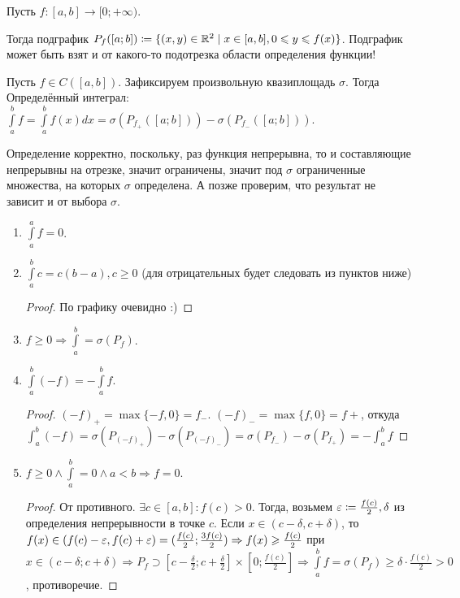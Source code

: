 \begin{definition}
	Пусть $f\!: [a, b] \to [0; +\infty)$.

    Тогда подграфик $P_f([a; b]) \coloneqq \{(x, y) \in \mathbb{R}^2 \mid x \in [a, b], 0 \leqslant y \leqslant f(x)\}$.
    Подграфик может быть взят и от какого-то подотрезка области определения функции!
\end{definition}
\begin{definition}
    Пусть $f \in C([a, b])$. Зафиксируем произвольную квазиплощадь $\sigma$. Тогда
    Определённый интеграл: $\int\limits_a^b f = \int\limits_a^b f(x) dx = \sigma(P_{f_+}([a; b])) - \sigma(P_{f_-}([a; b]))$.

    Определение корректно, поскольку, раз функция непрерывна, то и составляющие непрерывны на отрезке, значит ограничены, значит под $\sigma$ ограниченные множества, на которых $\sigma$ определена. А позже проверим, что результат не зависит и от выбора $\sigma$.
\end{definition}
\begin{properties}
    \begin{enumerate}
        \item $\int\limits_a^a f = 0$.
	\item $\int\limits_a^b c = c(b-a), c \ge 0$ (для отрицательных будет следовать из пунктов ниже)
            \begin{proof}
                По графику очевидно :)
            \end{proof}
        \item $f \ge 0 \Rightarrow \int\limits_a^b = \sigma(P_f)$.
        \item $\int\limits_a^b (-f) = -\int\limits_a^b f$.
             \begin{proof}
		     $(-f)_+ = \max\{-f, 0\} = f_-$.  $(-f)_- = \max\{f, 0\} = f+$, откуда $\int_a^b (-f) = \sigma(P_{(-f)_+}) - \sigma(P_{(-f)_-}) = \sigma(P_{f_-}) - \sigma(P_{f_+}) = -\int_a^b f$
            \end{proof}
        \item $f \ge 0 \land \int\limits_a^b = 0 \land a < b \Rightarrow f = 0$.
            \begin{proof}
                От противного. $\exists c \in [a, b]\!: f(c) > 0$. Тогда, возьмем $\varepsilon \coloneqq \frac{f(c)}{2}, \delta$ из определения непрерывности в точке $c$. Если  $x \in (c - \delta, c + \delta)$, то  $f(x) \in (f(c) - \varepsilon, f(c) + \varepsilon) = (\frac{f(c)}{2}; \frac{3f(c)}{2}) \Rightarrow f(x) \geqslant \frac{f(c)}{2}$ при $x \in (c - \delta; c + \delta) \Rightarrow P_f \supset [c-\frac{\delta}{2}; c + \frac{\delta}{2}]\times[0; \frac{f(c)}{2}] \Rightarrow \int\limits_a^b f = \sigma(P_f) \ge \delta \cdot \frac{f(c)}{2} > 0$, противоречие.
            \end{proof}
    \end{enumerate}
\end{properties}
